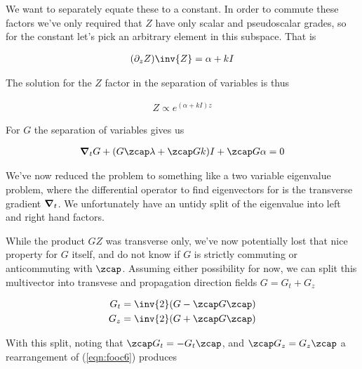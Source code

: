 We want to separately equate these to a constant.  In order to commute these factors we've only required that $Z$ have only scalar and pseudoscalar grades, so for the constant let's pick an arbitrary element in this subspace.  That is

\begin{align}\label{eqn:fooc4}
(\partial_z Z)\inv{Z} = \alpha + k I
\end{align}

The solution for the $Z$ factor in the separation of variables is thus

\begin{align}\label{eqn:fooc5}
Z \propto e^{(\alpha + k I)z}
\end{align}

For $G$ the separation of variables gives us

\begin{align}\label{eqn:fooc6}
\spacegrad_t G + (G \zcap \lambda + \zcap G k) I + \zcap G \alpha = 0
\end{align}

We've now reduced the problem to something like a two variable eigenvalue problem, where the differential operator to find eigenvectors for is the transverse gradient $\boldsymbol{\nabla}_t$.  We unfortunately have an untidy split of the eigenvalue into left and right hand factors.
%

While the product $GZ$ was transverse only, we've now potentially lost that nice property for $G$ itself, and do not know if $G$ is strictly commuting or anticommuting with $\zcap$.  Assuming either possibility for now, we can split this multivector into transvese and propagation direction fields $G = G_t + G_z$

\begin{align}\label{eqn:fooc7}
G_t &= \inv{2}(G - \zcap G \zcap) \\
G_z &= \inv{2}(G + \zcap G \zcap)
\end{align}

With this split, noting that $\zcap G_t = -G_t \zcap$, and $\zcap G_z = G_z \zcap$ a rearrangement of (\ref{eqn:fooc6}) produces

